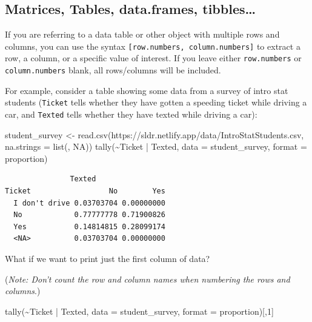 \documentclass[
  letterpaper,
  DIV=11,
  numbers=noendperiod]{scrreprt}
\newenvironment{Shaded}{\begin{snugshade}}{\end{snugshade}}
\newcommand{\AttributeTok}[1]{\textcolor[rgb]{0.40,0.45,0.13}{#1}}
\newcommand{\DecValTok}[1]{\textcolor[rgb]{0.68,0.00,0.00}{#1}}
\newcommand{\FunctionTok}[1]{\textcolor[rgb]{0.28,0.35,0.67}{#1}}
\newcommand{\NormalTok}[1]{\textcolor[rgb]{0.00,0.23,0.31}{#1}}
\newcommand{\OtherTok}[1]{\textcolor[rgb]{0.00,0.23,0.31}{#1}}
\newcommand{\SpecialCharTok}[1]{\textcolor[rgb]{0.37,0.37,0.37}{#1}}
\newcommand{\StringTok}[1]{\textcolor[rgb]{0.13,0.47,0.30}{#1}}
\theoremstyle{remark}
\begin{document}
\subsection{Matrices, Tables, data.frames,
tibbles\ldots{}}\label{matrices-tables-data.frames-tibbles}

If you are referring to a data table or other object with multiple rows
and columns, you can use the syntax
\texttt{{[}row.numbers,\ column.numbers{]}} to extract a row, a column,
or a specific value of interest. If you leave either
\texttt{row.numbers} or \texttt{column.numbers} blank, all rows/columns
will be included.

For example, consider a table showing some data from a survey of intro
stat students (\texttt{Ticket} tells whether they have gotten a speeding
ticket while driving a car, and \texttt{Texted} tells whether they have
texted while driving a car):

\begin{Shaded}
\begin{Highlighting}[]
\NormalTok{student\_survey }\OtherTok{\textless{}{-}} \FunctionTok{read.csv}\NormalTok{(}\StringTok{\textquotesingle{}https://sldr.netlify.app/data/IntroStatStudents.csv\textquotesingle{}}\NormalTok{, }
              \AttributeTok{na.strings =} \FunctionTok{list}\NormalTok{(}\StringTok{\textquotesingle{}\textquotesingle{}}\NormalTok{, }\StringTok{\textquotesingle{}NA\textquotesingle{}}\NormalTok{))}
\FunctionTok{tally}\NormalTok{(}\SpecialCharTok{\textasciitilde{}}\NormalTok{Ticket }\SpecialCharTok{|}\NormalTok{ Texted, }
      \AttributeTok{data =}\NormalTok{ student\_survey, }
      \AttributeTok{format =} \StringTok{\textquotesingle{}proportion\textquotesingle{}}\NormalTok{)}
\end{Highlighting}
\end{Shaded}

\begin{verbatim}
               Texted
Ticket                  No        Yes
  I don't drive 0.03703704 0.00000000
  No            0.77777778 0.71900826
  Yes           0.14814815 0.28099174
  <NA>          0.03703704 0.00000000
\end{verbatim}

What if we want to print just the first column of data?

(\emph{Note: Don't count the row and column names when numbering the
rows and columns}.)

\begin{Shaded}
\begin{Highlighting}[]
\FunctionTok{tally}\NormalTok{(}\SpecialCharTok{\textasciitilde{}}\NormalTok{Ticket }\SpecialCharTok{|}\NormalTok{ Texted, }
      \AttributeTok{data =}\NormalTok{ student\_survey,}
      \AttributeTok{format =} \StringTok{\textquotesingle{}proportion\textquotesingle{}}\NormalTok{)[,}\DecValTok{1}\NormalTok{]}
\end{Highlighting}
\end{Shaded}
\end{document}

